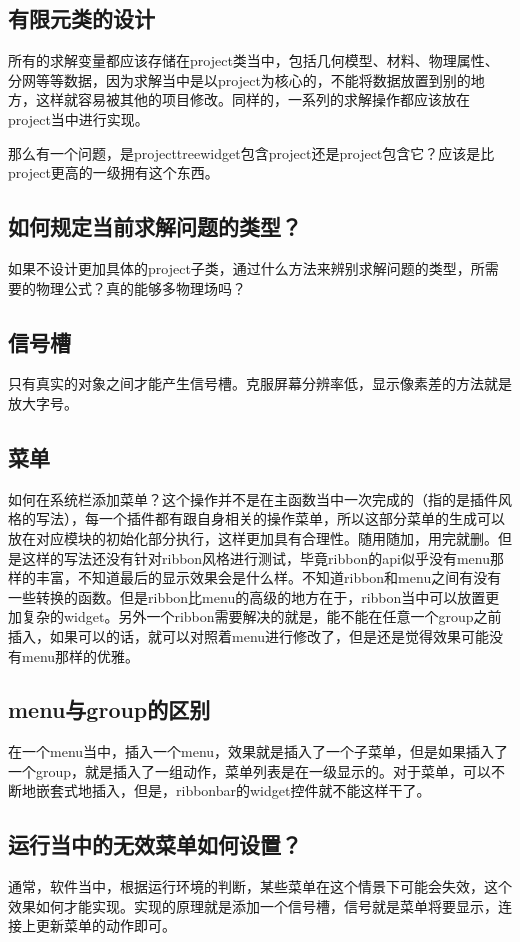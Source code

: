 \subsection{有限元类的设计}
所有的求解变量都应该存储在project类当中，包括几何模型、材料、物理属性、分网等等数据，因为求解当中是以project为核心的，不能将数据放置到别的地方，这样就容易被其他的项目修改。同样的，一系列的求解操作都应该放在project当中进行实现。

那么有一个问题，是projecttreewidget包含project还是project包含它？应该是比project更高的一级拥有这个东西。
\subsection{如何规定当前求解问题的类型？}
如果不设计更加具体的project子类，通过什么方法来辨别求解问题的类型，所需要的物理公式？真的能够多物理场吗？
\subsection{信号槽}
只有真实的对象之间才能产生信号槽。克服屏幕分辨率低，显示像素差的方法就是放大字号。
\subsection{菜单}
如何在系统栏添加菜单？这个操作并不是在主函数当中一次完成的（指的是插件风格的写法），每一个插件都有跟自身相关的操作菜单，所以这部分菜单的生成可以放在对应模块的初始化部分执行，这样更加具有合理性。随用随加，用完就删。但是这样的写法还没有针对ribbon风格进行测试，毕竟ribbon的api似乎没有menu那样的丰富，不知道最后的显示效果会是什么样。不知道ribbon和menu之间有没有一些转换的函数。但是ribbon比menu的高级的地方在于，ribbon当中可以放置更加复杂的widget。另外一个ribbon需要解决的就是，能不能在任意一个group之前插入，如果可以的话，就可以对照着menu进行修改了，但是还是觉得效果可能没有menu那样的优雅。
\subsection{menu与group的区别}
在一个menu当中，插入一个menu，效果就是插入了一个子菜单，但是如果插入了一个group，就是插入了一组动作，菜单列表是在一级显示的。对于菜单，可以不断地嵌套式地插入，但是，ribbonbar的widget控件就不能这样干了。
\subsection{运行当中的无效菜单如何设置？}
通常，软件当中，根据运行环境的判断，某些菜单在这个情景下可能会失效，这个效果如何才能实现。实现的原理就是添加一个信号槽，信号就是菜单将要显示，连接上更新菜单的动作即可。
